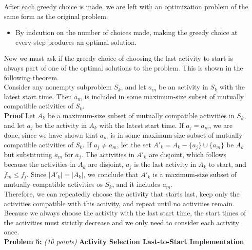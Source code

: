 \documentclass{article}
\begin{document}
After each greedy choice is made, we are left with an optimization problem of the same form as the original problem. 
\begin{itemize}	
	\item By indcution on the number of choices made, making the greedy choice at every step produces an optimal solution. 
\end{itemize}

Now we must ask if the greedy choice of choosing the last activity to start is always part of one of the optimal solutions to the problem. This is shown in the following theorem.
\\[.25cm]
Consider any nonempty subproblem $S_k$, and let $a_m$ be an activity in $S_k$ with the latest start time. Then $a_m$ is included in some maximum-size subset of mutually compatible activities of $S_k$.
\\[.25cm]
\textbf{Proof} Let $A_k$ be a maximum-size subset of mutually compatible activities in $S_k$, and let $a_j$ be the activity in $A_k$ with the latest start time. If $a_j = a_m$, we are done, since we have shown that $a_m$ is in some maximum-size subset of mutually compatible activities of $S_k$. If $a_j \neq a_m$, let the set $A'_k = A_k - \{a_j\} \cup \{a_m\}$ be $A_k$ but substituting $a_m$ for $a_j$. The activities in $A'_k$ are disjoint, which follows because the activities in $A_k$ are disjoint, $a_j$ is the last activity in $A_k$ to start, and $f_m \leq f_j$. Since $|A'_k| = |A_k|$, we conclude that $A'_k$ is a maximum-size subset of mutually compatible activities os $S_k$, and it includes $a_m$. 
\\[.25cm]
Therefore, we can repeatedly choose the activity that starts last, keep only the activities compatible with this activity, and repeat until no activities remain. Because we always choose the activity with the last start time, the start times of the activities must strictly decrease and we only need to consider each activity once. 
\\[.25cm]


\noindent \textbf{Problem 5:} \textit{(10 points)} \textbf{Activity Selection Last-to-Start Implementation}\\
\end{document}
